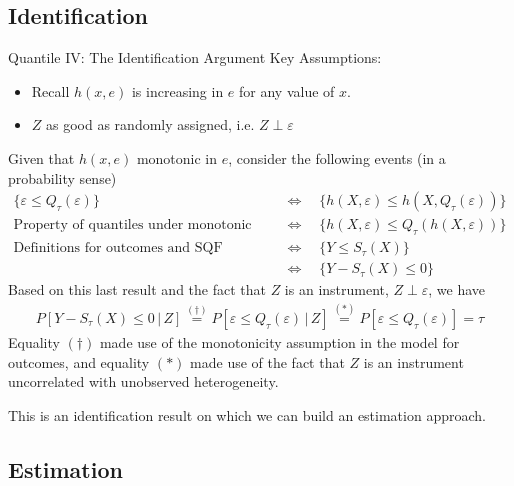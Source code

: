 \documentclass[aspectratio=169, handout]{beamer}
\begin{document}
\subsection{Identification}

{\scriptsize
\begin{frame}{Quantile IV: The Identification Argument}
\alert{Key Assumptions}:
\begin{itemize}
  \item Recall $h(x,e)$ is increasing in $e$ for any value of $x$.
  \item $Z$ as good as randomly assigned, i.e. $Z\perp \varepsilon$
\end{itemize}

Given that $h(x,e)$ monotonic in $e$,
consider the following events (in a probability sense)
\begin{align*}
  \{\varepsilon\leq Q_\tau(\varepsilon)\}
  \quad&\iff\quad
  \{h(X,\varepsilon)\leq h(X,Q_\tau(\varepsilon))\}
  \\
  \text{Property of quantiles under monotonic transf.}
  \quad&\iff\quad
  \{h(X,\varepsilon)\leq Q_\tau(h(X,\varepsilon))\}
  \\
  \text{Definitions for outcomes and SQF}
  \quad&\iff\quad
  \{Y\leq S_\tau(X)\}
  \\
  \quad&\iff\quad
  \{Y-S_\tau(X)\leq 0\}
\end{align*}
Based on this last result and the fact that $Z$ is an instrument,
$Z\perp \varepsilon$, we have
\begin{align*}
  P[Y-S_\tau(X)\leq 0\,|\,Z]
  \overset{(\dagger)}{=}
  P[\varepsilon \leq Q_\tau(\varepsilon)\,|\,Z]
  \overset{(*)}=
  P[\varepsilon \leq Q_\tau(\varepsilon)]
  =
  \tau
\end{align*}
Equality $(\dagger)$ made use of the monotonicity assumption in the
model for outcomes, and equality $(*)$ made use of the fact that $Z$ is
an instrument uncorrelated with unobserved heterogeneity.

This is an identification result on which we can build an estimation
approach.
\end{frame}
}


\subsection{Estimation}
\end{document}
